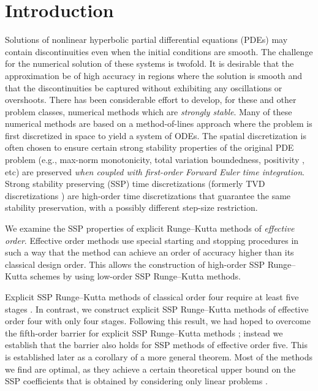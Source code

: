 \section{Introduction}\label{sec:Intro}
Solutions of nonlinear hyperbolic partial differential equations (PDEs) may 
contain discontinuities even when the initial conditions are smooth.
The challenge for the numerical solution of these systems is twofold. 
It is desirable that the approximation be of high accuracy in regions where 
the solution is smooth and that the discontinuities be captured without 
exhibiting any oscillations or overshoots. 
There has been considerable effort to develop, for these and other
problem classes, numerical methods which are \emph{strongly stable}.
Many of these numerical methods are based on a method-of-lines approach 
where the problem is first discretized in space to yield a system of ODEs. 
The spatial discretization is often chosen to ensure certain strong stability 
properties of the original PDE problem
(e.g., max-norm monotonicity, total variation boundedness,
positivity \cite{Horvath:2005}, etc) are preserved
\emph{when coupled with first-order Forward Euler time integration}.
Strong stability preserving (SSP) time discretizations (formerly TVD
discretizations \cite{Gottlieb/Shu:1998}) are high-order time
discretizations that guarantee the same stability preservation, with a
possibly different step-size restriction.

We examine the SSP properties of explicit Runge--Kutta methods of 
\emph{effective order}. 
Effective order methods use special starting and stopping procedures
in such a way that the method can achieve an order of
accuracy higher than its classical design order.
This allows the construction of high-order SSP Runge--Kutta schemes by
using low-order SSP Runge--Kutta methods.

Explicit SSP Runge--Kutta methods of classical order four require at 
least five stages \cite{Gottlieb/Shu:1998}. 
In contrast, we construct explicit SSP Runge--Kutta methods
of effective order four with only four stages.
Following this result, we had hoped to overcome the fifth-order
barrier for explicit SSP Runge--Kutta methods \cite{Ruuth2002}; instead we
establish that the barrier also holds for SSP methods of effective
order five.
This is established later as a corollary of a more general theorem.
Most of the methods we find are optimal, as they achieve a certain theoretical
upper bound on the SSP coefficients that is obtained by considering only
linear problems \cite{Kraaijevanger1986}.

